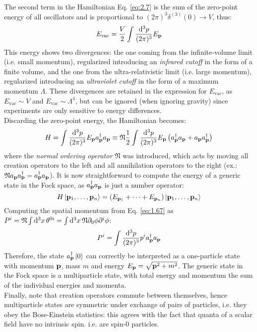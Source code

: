 The second term in the Hamiltonian Eq. \ref{eq:2.7} is the sum of the zero-point energy of all oscillators and is proportional to $ (2\pi)^3 \delta^{(3)}(0) \rightarrow V $, thus:
\begin{equation*}
  E_\text{vac} = \frac{V}{2} \int \frac{\mathrm{d}^3p}{(2\pi)^3} E_{\mathbf{p}}
\end{equation*}
This energy shows two divergences: the one coming from the infinite-volume limit (i.e. small momentum), regularized introducing an \textit{infrared cutoff} in the form of a finite volume, and the one from the ultra-relativistic limit (i.e. large momentum), regularized introducing an \textit{ultraviolet cutoff} in the form of a maximum momentum $ \Lambda $. These divergences are retained in the expression for $ E_\text{vac} $, as $ E_\text{vac} \sim V $ and $ E_\text{vac} \sim \Lambda^4 $, but can be ignored (when ignoring gravity) since experiments are only sensitive to energy differences.\\
Discarding the zero-point energy, the Hamiltonian becomes:
\begin{equation}
  H = \int \frac{\mathrm{d}^3p}{(2\pi)^3} E_{\mathbf{p}} a_{\mathbf{p}}^\dagger a_{\mathbf{p}} \equiv \mathfrak{N} \frac{1}{2} \int \frac{\mathrm{d}^3p}{(2\pi)^3} E_{\mathbf{p}} \left( a_{\mathbf{p}}^\dagger a_{\mathbf{p}} + a_{\mathbf{p}} a_{\mathbf{p}}^\dagger \right)
  \label{eq:2.9}
\end{equation}
where the \textit{normal ordering operator} $ \mathfrak{N} $ was introduced, which acts by moving all creation operators to the left and all annihilation operators to the right (ex.: $ \mathfrak{N} a_{\mathbf{p}} a_{\mathbf{p}}^\dagger = a_{\mathbf{p}}^\dagger a_{\mathbf{p}} $). It is now straightforward to compute the energy of a generic state in the Fock space, as $ a_{\mathbf{p}}^\dagger a_{\mathbf{p}} $ is just a number operator:
\begin{equation}
  H \ket{\mathbf{p}_1 , \dots , \mathbf{p}_n} = \left( E_{\mathbf{p}_1} + \dots + E_{\mathbf{p}_n} \right) \ket{\mathbf{p}_1 , \dots , \mathbf{p}_n}
  \label{eq:2.10}
\end{equation}
Computing the spatial momentum from Eq. \ref{eq:1.67} as $ P^i = \mathfrak{N} \int \mathrm{d}^3x\, \theta^{0i} = \int \mathrm{d}^3x\, \mathfrak{N} \partial_0 \phi \partial^i \phi $:
\begin{equation}
  P^i = \int \frac{\mathrm{d}^3p}{(2\pi)^3} p^i a_{\mathbf{p}}^\dagger a_{\mathbf{p}}
  \label{eq:2.11}
\end{equation}
Therefore, the state $ a_{\mathbf{p}}^\dagger \ket{0} $ can correctly be interpreted as a one-particle state with momentum $ \mathbf{p} $, mass $ m $ and energy $ E_{\mathbf{p}} = \sqrt{\mathbf{p}^2 + m^2} $. The generic state in the Fock space is a multiparticle state, with total energy and momentum the sum of the individual energies and momenta.\\
Finally, note that creation operators commute between themselves, hence multiparticle states are symmetric under exchange of pairs of particles, i.e. they obey the Bose-Einstein statistics: this agrees with the fact that quanta of a scalar field have no intrinsic spin. i.e. are spin-0 particles.

